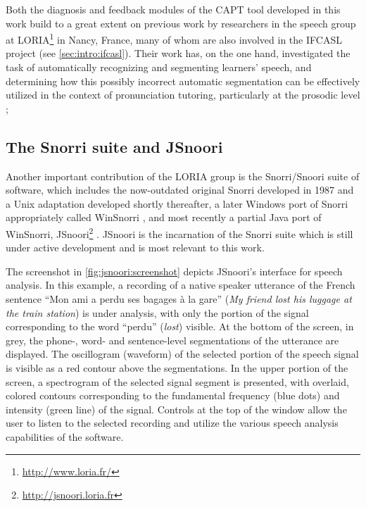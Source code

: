 		
	Both the diagnosis and feedback modules of the CAPT tool developed in this work build to a great extent on previous work by researchers in the speech group at LORIA\footnote{\url{http://www.loria.fr/}} in Nancy, France, many of whom are also involved in the IFCASL project (see \cref{sec:intro:ifcasl}). 
	 Their work has, on the one hand, investigated the task of automatically recognizing and segmenting learners' speech, and determining how this possibly incorrect automatic segmentation can be effectively utilized in the context of pronunciation tutoring, particularly at the prosodic level \citep{Mesbahi2011,Orosanu2012}; 
	
	\subsection{The Snorri suite and JSnoori}
	\label{sec:capt:snoori}
	
	Another important contribution of the LORIA group is 
	the Snorri/Snoori suite of software, 
	which includes the now-outdated original Snorri developed in 1987 \citep{Fohr1989} and a Unix adaptation developed shortly thereafter,
	a later Windows port of Snorri appropriately called WinSnorri \citep{Laprie1999},
	and most recently a partial Java port of WinSnorri, JSnoori\footnote{\url{http://jsnoori.loria.fr}} \citep{Parole2013}. 
	JSnoori is the incarnation of the Snorri suite which is still under active development and is 
	most relevant to this work.

	
	The screenshot in \cref{fig:jsnoori:screenshot} depicts JSnoori's interface for speech analysis. In this example, a recording of a native speaker utterance of the French sentence ``Mon ami a perdu ses bagages à la gare'' (\textit{My friend lost his luggage at the train station}) is under analysis, with only the portion of the signal corresponding to the word ``perdu'' (\textit{lost}) visible.  At the bottom of the screen, in grey, the phone-, word- and sentence-level segmentations of the utterance are displayed. The oscillogram (waveform) of the selected portion of the speech signal is visible as a red contour above the segmentations.  In the upper portion of the screen, a spectrogram of the selected signal segment is presented, with overlaid, colored contours corresponding to the fundamental frequency (blue dots) and intensity (green line) of the signal. Controls at the top of the window allow the user to listen to the selected recording and utilize the various speech analysis capabilities of the software.
	
